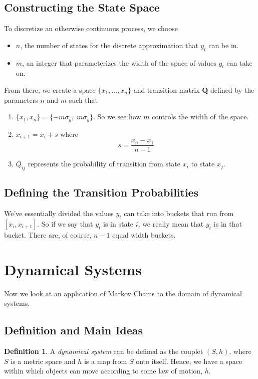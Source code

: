 \documentclass[12pt]{article}
\theoremstyle{plain}
\theoremstyle{definition}
\newtheorem{defn}[thm]{Definition}
\theoremstyle{remark}
\begin{document}
\subsection{Constructing the State Space}
To discretize an otherwise continuous process, we choose
\begin{itemize}
    \item $n$, the number of states for the discrete 
	approximation that $y_t$ can be in.
    \item $m$, an integer that parameterizes the width of
	the space of values $y_t$ can take on.
\end{itemize}
From there, we create a space $\{x_1, \ldots, x_n\}$ and
transition matrix $\mathbf{Q}$ defined
by the parameters $n$ and $m$ such that
\begin{enumerate}
    \item $\{ x_1, x_n \} = \{ -m \sigma_y, \; m \sigma_y \}$.
	So we see how $m$ controls the width of the space.
    \item $x_{i+1} = x_i + s$ where
	\[ s = \frac{x_n - x_1}{n-1} \]
    \item $Q_{ij}$ represents the probability of transition
	from state $x_i$ to state $x_j$. 
\end{enumerate}

\subsection{Defining the Transition Probabilities}

We've essentially divided the values $y_t$ can take into buckets
that run from $[x_i, x_{i+1}]$.  So if we say that $y_t$
is in state $i$, we really mean that $y_t$ is in that bucket.
There are, of course, $n-1$ equal width buckets.


\newpage
\section{Dynamical Systems}

Now we look at an application of Markov Chains to the domain of {dynamical systems}.

\subsection{Definition and Main Ideas}

\begin{defn}
A \emph{dynamical system} can be defined as the couplet $(S,h)$, where $S$ is a metric space and $h$ is a map from $S$ onto itself. Hence, we have a space within which objects can move according to some law of motion, $h$.
\end{defn}
\end{document}

